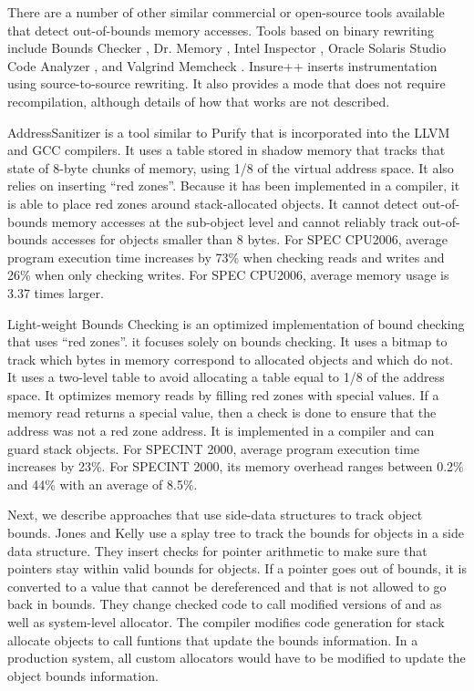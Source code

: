 There are a number of other similar commercial or open-source tools available
that detect out-of-bounds memory accesses.
Tools based on binary rewriting include Bounds Checker \cite{BoundsChecker2016}, 
Dr. Memory \cite{Bruening2011,DrMemory2016}, Intel Inspector \cite{Intel2016},
Oracle Solaris Studio Code Analyzer \cite{CodeAnalyzer2016},
and Valgrind Memcheck  \cite{Nethercote2007, Valgrind2016}.  Insure++ 
\cite{Insure2016}
inserts instrumentation using source-to-source rewriting.  It also provides
a mode that does not require recompilation, although details of how that
works are not described.

AddressSanitizer \cite{Serebryany2012} is a tool similar to Purify that is
incorporated into the LLVM and GCC compilers.  It uses a table
stored in shadow memory that tracks that state of 8-byte chunks of memory, using
1/8 of the virtual address space.  It also relies on inserting ``red zones''.
Because it has been implemented in a compiler, it is able to place red zones
around stack-allocated objects.   It cannot detect out-of-bounds memory
accesses at the sub-object level and cannot reliably track out-of-bounds accesses
for objects smaller than 8 bytes.  For SPEC CPU2006, average program execution time
increases by 73\% when checking reads and writes and 26\%
when only checking writes. For SPEC CPU2006, average memory usage is 
3.37 times larger.

Light-weight Bounds Checking \cite{Hasabnis2012} is an optimized implementation of bound
checking that uses ``red zones''.
it focuses solely on bounds checking.  It uses a bitmap to track
which bytes in memory correspond to allocated objects and which do not.
It uses a two-level table to avoid allocating a table equal to 1/8 of the
address space.  It optimizes memory reads by filling red zones with special
values.  If a memory read returns a special value, then a check is done to
ensure that the address was not a red zone address.  It is implemented in a compiler and can guard stack objects.  For SPECINT 2000, average 
program execution time increases by 23\%. For SPECINT 2000, its memory 
overhead ranges between 0.2\% and 44\% with an average of 8.5\%.

Next, we describe approaches that use side-data structures to track
object bounds.   
Jones and Kelly \cite{Jones1997} use a splay tree to track the bounds for
objects in a side data structure.  They insert 
checks for pointer arithmetic to make sure that pointers stay within valid bounds for
objects.  If a pointer goes out of bounds, it is converted to a value that cannot
be dereferenced and that is not allowed to go back in bounds. 
They change checked code to call modified versions of 
and   as well as system-level allocator.  The compiler modifies
code generation for stack allocate objects to call funtions that update the 
bounds information. In a production system, all custom allocators would have to be
modified to update the object bounds information.  

